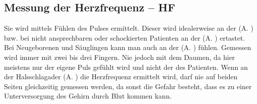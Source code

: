 


\subsection{Messung der Herzfrequenz -- HF}
\label{topic:pulsmessung}



Sie wird mittels Fühlen des Pulses
ermittelt.  
Dieser wird idealerweise an der
 (A. ) bzw. bei nicht
ansprechbaren oder schockierten Patienten an der
 (A. ) ertastet. Bei
Neugeborenen und Säuglingen kann man auch an der
 (A. ) fühlen. Gemessen
wird immer mit zwei bis drei Fingern. Nie jedoch mit dem Daumen, da hier meistens nur der eigene Puls gefühlt wird und nicht der des
Patienten. Wenn an der Halsschlagader (A. ) die
Herzfrequenz ermittelt wird, darf nie auf beiden Seiten
gleichzeitig gemessen werden, da sonst die Gefahr besteht,
dass es zu einer Unterversorgung des Gehirn durch Blut kommen
kann.


